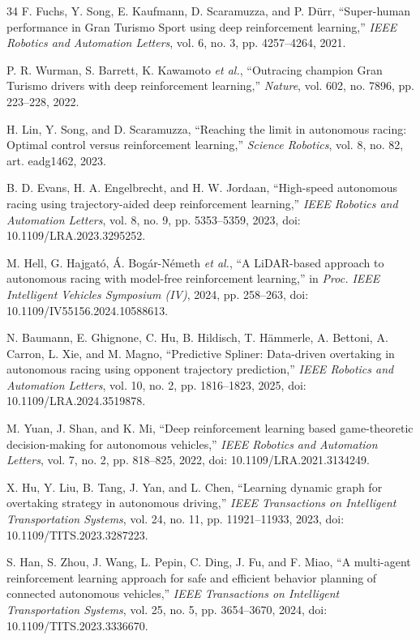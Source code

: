 \documentclass[journal,twoside,web]{ieeecolor}
\begin{document}
\begin{thebibliography}{34}
F. Fuchs, Y. Song, E. Kaufmann, D. Scaramuzza, and P. D\"urr,
``Super-human performance in Gran Turismo Sport using deep reinforcement
learning,'' \emph{IEEE Robotics and Automation Letters}, vol. 6, no. 3,
pp. 4257--4264, 2021.

P. R. Wurman, S. Barrett, K. Kawamoto \emph{et al.},
``Outracing champion Gran Turismo drivers with deep reinforcement learning,''
\emph{Nature}, vol. 602, no. 7896, pp. 223--228, 2022.

H. Lin, Y. Song, and D. Scaramuzza,
``Reaching the limit in autonomous racing: Optimal control versus
reinforcement learning,'' \emph{Science Robotics}, vol. 8, no. 82,
art. eadg1462, 2023.

B. D. Evans, H. A. Engelbrecht, and H. W. Jordaan,
``High-speed autonomous racing using trajectory-aided deep reinforcement
learning,'' \emph{IEEE Robotics and Automation Letters}, vol. 8, no. 9,
pp. 5353--5359, 2023, doi: 10.1109/LRA.2023.3295252.

M. Hell, G. Hajgat\'o, \'A. Bog\'ar-N\'emeth \emph{et al.},
``A LiDAR-based approach to autonomous racing with model-free reinforcement
learning,'' in \emph{Proc. IEEE Intelligent Vehicles Symposium (IV)}, 2024,
pp. 258--263, doi: 10.1109/IV55156.2024.10588613.

N. Baumann, E. Ghignone, C. Hu, B. Hildisch, T. H\"ammerle,
A. Bettoni, A. Carron, L. Xie, and M. Magno,
``Predictive Spliner: Data-driven overtaking in autonomous racing using
opponent trajectory prediction,'' \emph{IEEE Robotics and Automation
Letters}, vol. 10, no. 2, pp. 1816--1823, 2025,
doi: 10.1109/LRA.2024.3519878.

M. Yuan, J. Shan, and K. Mi,
``Deep reinforcement learning based game-theoretic decision-making for
autonomous vehicles,'' \emph{IEEE Robotics and Automation Letters}, vol. 7,
no. 2, pp. 818--825, 2022, doi: 10.1109/LRA.2021.3134249.

X. Hu, Y. Liu, B. Tang, J. Yan, and L. Chen,
``Learning dynamic graph for overtaking strategy in autonomous driving,''
\emph{IEEE Transactions on Intelligent Transportation Systems}, vol. 24,
no. 11, pp. 11921--11933, 2023, doi: 10.1109/TITS.2023.3287223.

S. Han, S. Zhou, J. Wang, L. Pepin, C. Ding, J. Fu, and F. Miao,
``A multi-agent reinforcement learning approach for safe and efficient
behavior planning of connected autonomous vehicles,''
\emph{IEEE Transactions on Intelligent Transportation Systems}, vol. 25,
no. 5, pp. 3654--3670, 2024, doi: 10.1109/TITS.2023.3336670.


\end{thebibliography}
\end{document}
